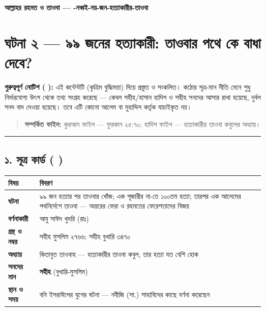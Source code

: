 

\begin{center}{\Large\bfseries\color{emerald} আল্লাহর রহমত ও তাওবা — -নব্বই-নয়-জন-হত্যাকারীর-তাওবা}\end{center}
\vspace{1em}
\section*{ঘটনা ২ — ৯৯ জনের হত্যাকারী: তাওবার পথে কে বাধা দেবে?}

\begin{warnbox}
 \textbf{গুরুত্বপূর্ণ নোটিশ ( ):} এই কন্টেন্টটি  (কৃত্রিম বুদ্ধিমত্তা) দিয়ে প্রস্তুত ও সংকলিত।  কঠোর সূত্র-মান নীতি মেনে শুধু নির্ভরযোগ্য উৎস থেকে তথ্য সংগ্রহ করেছে — কেবল সহীহ/হাসান হাদিস ও সহীহ সনদের আসার রাখা হয়েছে, দুর্বল সনদ বাদ দেওয়া হয়েছে। তবে এটি কোনো আলেম বা মুহাদ্দিস কর্তৃক যাচাইকৃত নয়।
\end{warnbox}

\begin{quote}
\textbf{সম্পর্কিত ফাইল:} কুরআন ফাইল — ফুরকান ২৫:৭০; হাদিস ফাইল — হত্যাকারীর তাওবা কবুলের অধ্যায়।
\end{quote}

\medskip\hrule\medskip

\subsection*{১. সূত্র কার্ড ( )}

\begin{table}[h]\centering\small
\begin{tabular}{ll}
বিষয় & বিবরণ \\
\hline
\textbf{ঘটনা} & ৯৯ জন হত্যার পর তাওবার খোঁজ; এক পূজারীর \lat{“}না\lat{”}-তে ১০০তম হত্যা; তারপর এক আলেমের পথনির্দেশে তাওবা — অন্তরের ফেরা ও রহমতের ফেরেশতাদের বিজয় \\
\textbf{বর্ণনাকারী} & আবু সাঈদ খুদরি (রাঃ) \\
\textbf{গ্রন্থ ও নম্বর} & সহীহ মুসলিম ২৭৬৬; সহীহ বুখারি ৩৪৭০ \\
\textbf{অধ্যায়} & কিতাবুত তাওবাহ — \lat{“}হত্যাকারীর তাওবা কবুল, তার হত্যা যত বেশি হোক\lat{”} \\
\textbf{সনদের মান} & \textbf{সহীহ} (বুখারি-মুসলিম) \\
\textbf{স্থান ও সময়} & বনি ইসরাঈলের যুগের ঘটনা — নবীজি (সা.) সাহাবিদের কাছে বর্ণনা করেছেন \\
\hline
\end{tabular}
\end{table}

